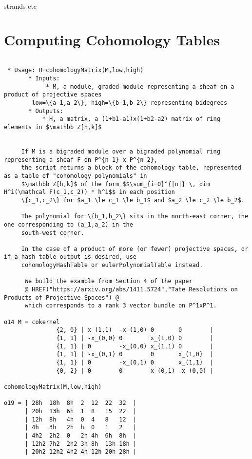 \documentclass[twoside,12pt, leqno]{amsart}
\begin{document}
strands etc

\section{Computing Cohomology Tables}

\begin{verbatim}
 
 * Usage: H=cohomologyMatrix(M,low,high)
       * Inputs:
            * M, a module, graded module representing a sheaf on a product of projective spaces
        low=\{a_1,a_2\}, high=\{b_1,b_2\} representing bidegrees
       * Outputs:
           * H, a matrix, a (1+b1-a1)x(1+b2-a2) matrix of ring elements in $\mathbb Z[h,k]$

 
     If M is a bigraded module over a bigraded polynomial ring representing a sheaf F on P^{n_1} x P^{n_2},
     the script returns a block of the cohomology table, represented as a table of "cohomology polynomials" in
     $\mathbb Z[h,k]$ of the form $$\sum_{i=0}^{|n|} \, dim H^i(\mathcal F(c_1,c_2)) * h^i$$ in each position
     \{c_1,c_2\} for $a_1 \le c_1 \le b_1$ and $a_2 \le c_2 \le b_2$. 
     
     The polynomial for \{b_1,b_2\} sits in the north-east corner, the one corresponding to (a_1,a_2) in the
     south-west corner.

     In the case of a product of more (or fewer) projective spaces, or if a hash table output is desired, use
     cohomologyHashTable or eulerPolynomialTable instead.

      We build the example from Section 4 of the paper
      @ HREF("https://arxiv.org/abs/1411.5724","Tate Resolutions on Products of Projective Spaces") @
      which corresponds to a rank 3 vector bundle on P^1xP^1. 

o14 M = cokernel 
               {2, 0} | x_(1,1)  -x_(1,0) 0       0        |
               {1, 1} | -x_(0,0) 0        x_(1,0) 0        |
               {1, 1} | 0        -x_(0,0) x_(1,1) 0        |
               {1, 1} | -x_(0,1) 0        0       x_(1,0)  |
               {1, 1} | 0        -x_(0,1) 0       x_(1,1)  |
               {0, 2} | 0        0        x_(0,1) -x_(0,0) |
   
cohomologyMatrix(M,low,high)

o19 = | 28h  18h  8h  2  12  22  32  |
      | 20h  13h  6h  1  8   15  22  |
      | 12h  8h   4h  0  4   8   12  |
      | 4h   3h   2h  h  0   1   2   |
      | 4h2  2h2  0   2h 4h  6h  8h  |
      | 12h2 7h2  2h2 3h 8h  13h 18h |
      | 20h2 12h2 4h2 4h 12h 20h 28h |   
      
    \end{verbatim}
\end{document}
